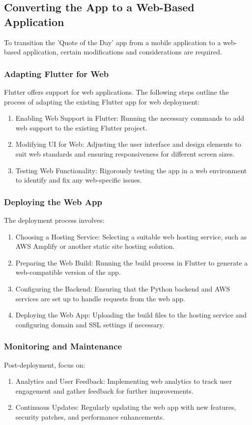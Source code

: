 \documentclass{book}
\begin{document}
\subsection{Converting the App to a Web-Based Application}
To transition the 'Quote of the Day' app from a mobile application to a web-based application, certain modifications and considerations are required.

\subsubsection{Adapting Flutter for Web}
Flutter offers support for web applications. The following steps outline the process of adapting the existing Flutter app for web deployment:
\begin{enumerate}
    \item Enabling Web Support in Flutter: Running the necessary commands to add web support to the existing Flutter project.
    \item Modifying UI for Web: Adjusting the user interface and design elements to suit web standards and ensuring responsiveness for different screen sizes.
    \item Testing Web Functionality: Rigorously testing the app in a web environment to identify and fix any web-specific issues.
\end{enumerate}

\subsubsection{Deploying the Web App}
The deployment process involves:
\begin{enumerate}
    \item Choosing a Hosting Service: Selecting a suitable web hosting service, such as AWS Amplify or another static site hosting solution.
    \item Preparing the Web Build: Running the build process in Flutter to generate a web-compatible version of the app.
    \item Configuring the Backend: Ensuring that the Python backend and AWS services are set up to handle requests from the web app.
    \item Deploying the Web App: Uploading the build files to the hosting service and configuring domain and SSL settings if necessary.
\end{enumerate}

\subsubsection{Monitoring and Maintenance}
Post-deployment, focus on:
\begin{enumerate}
    \item Analytics and User Feedback: Implementing web analytics to track user engagement and gather feedback for further improvements.
    \item Continuous Updates: Regularly updating the web app with new features, security patches, and performance enhancements.
\end{enumerate}
\end{document}
